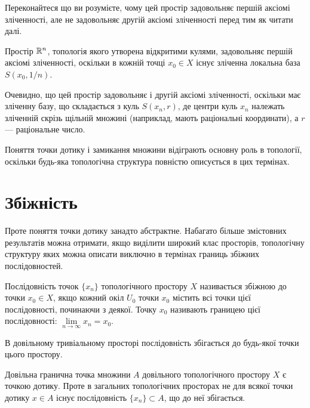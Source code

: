 \begin{exercise}
Переконайтеся що ви розумієте, чому цей простір задовольняє першій аксіомі
зліченності, але не задовольняє другій аксіомі зліченності перед тим як читати далі.
\end{exercise}

\begin{example}
Простір $\mathbb{R}^n$, топологія якого утворена
відкритими кулями, задовольняє першій аксіомі зліченності,
оскільки в кожній точці $x_0 \in X$ існує зліченна локальна база
$S(x_0, 1 / n)$.

Очевидно, що цей простір задовольняє і другій
аксіомі зліченності, оскільки має зліченну базу, що
складається з куль $S(x_n, r)$, де центри куль $x_n$ належать
зліченній скрізь щільній множині (наприклад, мають
раціональні координати), а $r$ --- раціональне число.
\end{example}

Поняття точки дотику і замикання множини відіграють
основну роль в топології, оскільки будь-яка топологічна
структура повністю описується в цих термінах.

\section{Збіжність}

Проте поняття точки дотику занадто абстрактне.
Набагато більше змістовних результатів можна отримати,
якщо виділити широкий клас просторів, топологічну
структуру яких можна описати виключно в термінах
границь збіжних послідовностей.

\begin{definition}
Послідовність точок $\{x_n\}$ топологічного
простору $X$ називається збіжною до точки $x_0 \in X$, якщо
кожний окіл $U_0$ точки $x_0$ містить всі точки цієї
послідовності, починаючи з деякої. Точку $x_0$ називають
границею цієї послідовності: $\lim\limits_{n \to \infty} x_n = x_0$.
\end{definition}

\begin{example}
В довільному тривіальному просторі
послідовність збігається до будь-якої точки цього простору.
\end{example}

Довільна гранична точка множини $A$ довільного
топологічного простору $X$ є точкою дотику. Проте в
загальних топологічних просторах не для всякої точки
дотику $x \in A$ існує послідовність $\{x_n\} \subset A$, що до неї
збігається.

